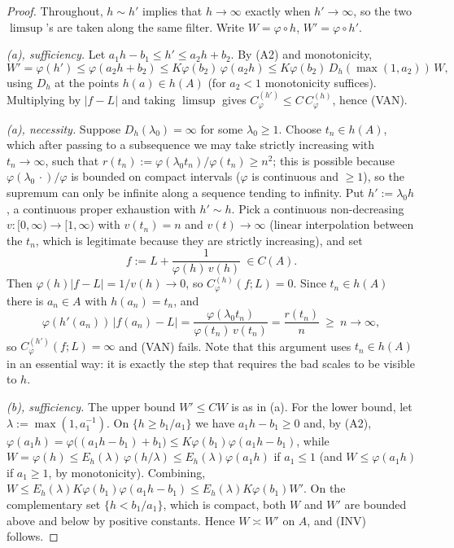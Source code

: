 \documentclass[10pt,a4paper]{amsart}
\begin{document}
\begin{proof}
Throughout, $h\sim h'$ implies that $h\to\infty$ exactly when $h'\to\infty$, so the two
$\limsup$'s are taken along the same filter. Write $W=\varphi\circ h$, $W'=\varphi\circ h'$.

\emph{(a), sufficiency.} Let $a_1h-b_1\le h'\le a_2h+b_2$. By (A2) and monotonicity,
\[
W'=\varphi(h')\le\varphi(a_2h+b_2)\le K\varphi(b_2)\,\varphi(a_2h)
\le K\varphi(b_2)\,D_h(\max(1,a_2))\,W ,
\]
using $D_h$ at the points $h(a)\in h(A)$ (for $a_2<1$ monotonicity suffices). Multiplying
by $|f-L|$ and taking $\limsup$ gives $C^{(h')}_\varphi\le C\,C^{(h)}_\varphi$, hence (VAN).

\emph{(a), necessity.} Suppose $D_h(\lambda_0)=\infty$ for some $\lambda_0\ge1$. Choose
$t_n\in h(A)$, which after passing to a subsequence we may take strictly increasing with
$t_n\to\infty$, such that $r(t_n):=\varphi(\lambda_0t_n)/\varphi(t_n)\ge n^{2}$; this is
possible because $\varphi(\lambda_0\,\cdot)/\varphi$ is bounded on compact intervals
($\varphi$ is continuous and $\ge1$), so the supremum can only be infinite along a sequence
tending to infinity. Put $h':=\lambda_0h$, a continuous proper exhaustion with $h'\sim h$.
Pick a continuous non-decreasing $v:[0,\infty)\to[1,\infty)$ with $v(t_n)=n$ and
$v(t)\to\infty$ (linear interpolation between the $t_n$, which is legitimate because they
are strictly increasing), and set
\[
f:=L+\frac{1}{\varphi(h)\,v(h)}\ \in C(A).
\]
Then $\varphi(h)|f-L|=1/v(h)\to0$, so $C^{(h)}_\varphi(f;L)=0$. Since $t_n\in h(A)$ there
is $a_n\in A$ with $h(a_n)=t_n$, and
\[
\varphi(h'(a_n))\,|f(a_n)-L|=\frac{\varphi(\lambda_0t_n)}{\varphi(t_n)\,v(t_n)}
=\frac{r(t_n)}{n}\ \ge\ n\longrightarrow\infty,
\]
so $C^{(h')}_\varphi(f;L)=\infty$ and (VAN) fails. Note that this argument uses
$t_n\in h(A)$ in an essential way: it is exactly the step that requires the bad scales to
be visible to $h$.

\emph{(b), sufficiency.} The upper bound $W'\le CW$ is as in (a). For the lower bound, let
$\lambda:=\max(1,a_1^{-1})$. On $\{h\ge b_1/a_1\}$ we have $a_1h-b_1\ge0$ and, by (A2),
$\varphi(a_1h)=\varphi\bigl((a_1h-b_1)+b_1\bigr)\le K\varphi(b_1)\varphi(a_1h-b_1)$, while
$W=\varphi(h)\le E_h(\lambda)\,\varphi(h/\lambda)\le E_h(\lambda)\varphi(a_1h)$ if
$a_1\le1$ (and $W\le\varphi(a_1h)$ if $a_1\ge1$, by monotonicity). Combining,
$W\le E_h(\lambda)K\varphi(b_1)\varphi(a_1h-b_1)\le E_h(\lambda)K\varphi(b_1)W'$. On the
complementary set $\{h<b_1/a_1\}$, which is compact, both $W$ and $W'$ are bounded above
and below by positive constants. Hence $W\asymp W'$ on $A$, and (INV) follows.


\end{proof}
\end{document}
